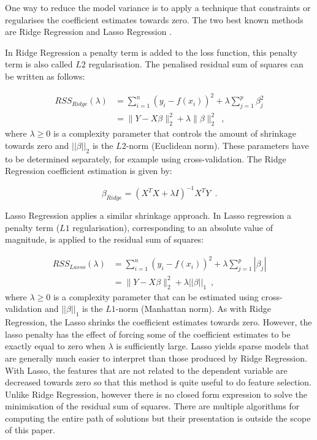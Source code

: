 One way to reduce the model variance is to apply a technique that constraints or regularises the coefficient estimates towards zero. The two best known methods are Ridge Regression \citep{hoerl1970ridge} and Lasso Regression \citep{tibshirani1996regression}. 

In Ridge Regression a penalty term is added to the loss function, this penalty term is also called $L2$ regularisation. The penalised residual sum of squares can be written as follows:

\begin{equation}
\begin{aligned}
 RSS_{Ridge}(\lambda) & = \sum_{i=1}^{n}(y_i -f(x_i))^2 + \lambda\sum_{j=1}^{p}\beta^{2}_{j} \\
& = \|Y - X\beta\|_2^2 + \lambda\|\beta\|_2^2
    \enspace,
\end{aligned}
\end{equation}
where $ \lambda \geq 0 $ is a complexity parameter that controls the amount of shrinkage towards zero and $||\beta||_2$ is the $L2$-norm (Euclidean norm). These parameters have to be determined separately, for example using cross-validation. The Ridge Regression coefficient estimation is given by:

\begin{equation}
    \beta_{Ridge} = (X^TX + \lambda I)^{-1}X^TY
    \enspace.
\end{equation}

Lasso Regression applies a similar shrinkage approach. In Lasso regression a penalty term ($L1$ regularisation), corresponding to an absolute value of magnitude, is applied to the residual sum of squares:

\begin{equation}
\begin{aligned}
 RSS_{Lasso}(\lambda) & = \sum_{i=1}^{n}(y_i -f(x_i))^2 + \lambda\sum_{j=1}^{p}|\beta_{j}| \\
& = \|Y - X\beta\|_2^2 + \lambda||\beta||_1
    \enspace,
\end{aligned}
\end{equation}
where $\lambda \geq 0 $ is a complexity parameter that can be estimated using cross-validation and $||\beta||_1$ is the $L1$-norm (Manhattan norm). As with Ridge Regression, the Lasso shrinks the coefficient estimates towards zero. However, the lasso penalty has the effect of forcing some of the coefficient estimates to be exactly equal to zero when $\lambda$ is sufficiently large. Lasso yields sparse models that are generally much easier to interpret than those produced by Ridge Regression. With Lasso, the features that are not related to the dependent variable are decreased towards zero so that this method is quite useful to do feature selection. Unlike Ridge Regression, however there is no closed form expression to solve the minimisation of the residual sum of squares. There are multiple algorithms for computing the entire path of solutions but their presentation is outside the scope of this paper. 

